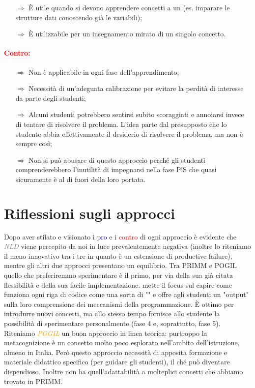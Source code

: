 \begin{itemize}
    \item [$\Rightarrow$] È utile quando si devono apprendere concetti a un  (es. imparare le strutture dati conoscendo già le variabili);
    \item [$\Rightarrow$] È utilizzabile per un insegnamento mirato di un singolo concetto.
\end{itemize}

\paragraph{\textcolor{red}{Contro:}}

\begin{itemize}
    \item [$\Rightarrow$] Non è applicabile in ogni fase dell'apprendimento;
    \item [$\Rightarrow$] Necessità di un'adeguata calibrazione per evitare la perdità di interesse da parte degli studenti;
    \item [$\Rightarrow$] Alcuni studenti potrebbero sentirsi subito scoraggiati e annoiarsi invece di tentare di risolvere il problema. 
    L'idea parte dal presupposto che lo studente abbia effettivamente il desiderio di risolvere il problema, ma non è sempre così;
    \item [$\Rightarrow$] Non si può abusare di questo approccio perché gli studenti comprenderebbero l'inutilità di impegnarsi nella fase P!S che quasi sicuramente è al di fuori della loro portata. 
\end{itemize}

\section{Riflessioni sugli approcci}

Dopo aver stilato e visionato i \textcolor{blue}{pro} e i \textcolor{red}{contro} di ogni 
approccio è evidente che \textit{\textcolor{gray}{NLD}} viene percepito da noi in luce prevalentemente negativa (inoltre lo
riteniamo il meno innovativo tra i tre in quanto è un estensione di productive failure), mentre gli altri
due approcci presentano un equilibrio. Tra PRIMM e POGIL quello che preferiremmo sperimentare è il primo, per via 
della sua già citata flessibilità e della sua facile implementazione.  mette il focus
sul capire come funziona ogni riga di codice come una sorta di "" e offre agli studenti
un "output" sulla loro comprensione dei meccanismi della programmazione. È ottimo per introdurre nuovi concetti,
ma allo stesso tempo fornisce allo studente la possibilità di sperimentare personalmente (fase 4 e, soprattutto, fase 5).
Riteniamo \textit{\textcolor{orange}{POGIL}} un buon approccio in linea teorica: purtroppo la metacognizione è un concetto
molto poco esplorato nell'ambito dell'istruzione, almeno in Italia. Però questo approccio necessità di apposita formazione e 
materiale didattico specifico (per guidare gli studenti), il ché può diventare dispendioso. Inoltre non ha quell'adattabilità
a molteplici concetti che abbiamo trovato in PRIMM.